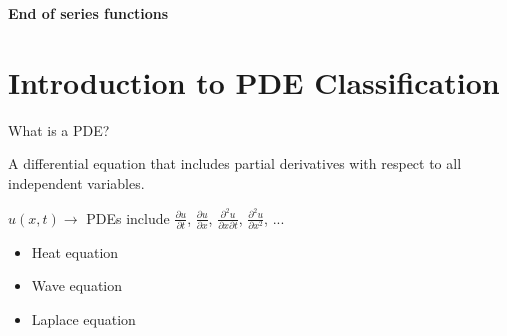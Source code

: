 \textbf{End of series functions}

\section{Introduction to PDE Classification}

What is a PDE?

A differential equation that includes partial derivatives with respect to all independent variables. 

$u(x,t) \longrightarrow$ PDEs include $\frac{\partial u}{\partial t}$, $\frac{\partial u}{\partial x}$, $\frac{\partial^2 u}{\partial x \partial t}$, $\frac{\partial^2 u}{\partial x^2}$, ...

\begin{itemize}
    \item Heat equation
    \item Wave equation
    \item Laplace equation
\end{itemize}
